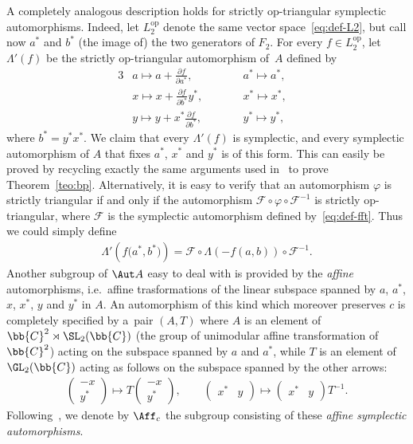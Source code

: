 A completely analogous description holds for strictly op-triangular symplectic automorphisms.
Indeed, let \(L_{2}^{\mathrm{op}}\) denote the same vector space~\eqref{eq:def-L2}, but call now \(a^{*}\)
and \(b^{*}\) (the image of) the two generators of \(F_{2}\).
For every \(f\in L_{2}^{\mathrm{op}}\), let \(\Lambda'(f)\) be the strictly op-triangular automorphism of~\(A\) def\/ined by
\begin{alignat*}{3}
& a\mapsto a+\frac{\partial f}{\partial a^{*}}, \qquad && a^{*}\mapsto a^{*}, & \\
& x\mapsto x+\frac{\partial f}{\partial b^{*}}y^{*}, \qquad && x^{*}\mapsto x^{*}, & \\
& y\mapsto y+x^{*}\frac{\partial f}{\partial b^{*}}, \qquad && y^{*}\mapsto y^{*}, &
\end{alignat*}
where \(b^{*} = y^{*}x^{*}\).
We claim that every \(\Lambda'(f)\) is symplectic, and every symplectic automorphism of \(A\) that f\/ixes
\(a^{*}\), \(x^{*}\) and \(y^{*}\) is of this form.
This can easily be proved by recycling exactly the same arguments used in~\cite{bp08} to prove
Theorem~\ref{teo:bp}.
Alternatively, it is easy to verify that an automorphism \(\varphi\) is strictly triangular if and only if
the automorphism \(\mathcal{F}\circ \varphi\circ \mathcal{F}^{-1}\) is strictly op-triangular, where
\(\mathcal{F}\) is the symplectic automorphism def\/ined by~\eqref{eq:def-fft}.
Thus we could simply def\/ine
\begin{gather}
\label{eq:t-opt}
\Lambda'(f\big(a^{*},b^{*}\big))=\mathcal{F}\circ\Lambda(-f(a,b))\circ\mathcal{F}^{-1}.
\end{gather}
Another subgroup of \(\Aut A\) easy to deal with is provided by the \emph{affine} automorphisms, i.e.\
af\/f\/ine trasformations of the linear subspace spanned by \(a\), \(a^{*}\), \(x\), \(x^{*}\), \(y\) and
\(y^{*}\) in \(A\).
An automorphism of this kind which moreover preserves \(c\) is completely specif\/ied by a~pair \((A,T)\)
where \(A\) is an element of \(\bb{C}^{2}\rtimes \SL_{2}(\bb{C})\) (the group of unimodular af\/f\/ine
transformation of \(\bb{C}^{2}\)) acting on the subspace spanned by \(a\) and \(a^{*}\), while \(T\) is an
element of \(\GL_{2}(\bb{C})\) acting as follows on the subspace spanned by the other arrows:
\begin{gather*}%
\begin{pmatrix}
-x
\\
y^{*}
\end{pmatrix}
\mapsto T
\begin{pmatrix}
-x
\\
y^{*}
\end{pmatrix},
\qquad
\begin{pmatrix}
x^{*}&y
\end{pmatrix}
\mapsto
\begin{pmatrix}
x^{*}&y
\end{pmatrix}
T^{-1}.
\end{gather*}
Following~\cite{bp08}, we denote by \(\Aff_{c}\) the subgroup consisting of these \emph{affine symplectic
automorphisms}.

